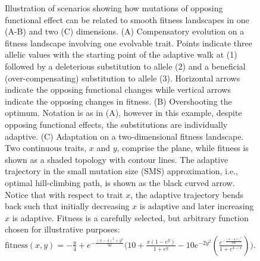 \documentclass[dvips,12pt,twoside,titlepage]{article}
\begin{document}
\begin{figure}[p]
\begin{center}
\caption{Illustration of scenarios showing how mutations of opposing functional effect can be related to smooth fitness landscapes in one (A-B) and two (C) dimensions. (A) Compensatory evolution on a fitness landscape involving one evolvable trait. Points indicate three allelic values with the starting point of the adaptive walk at {\scriptsize (1)} followed by a deleterious substitution to allele {\scriptsize (2)} and a beneficial (over-compensating) substitution to allele {\scriptsize (3)}. Horizontal arrows indicate the opposing functional changes while vertical arrows indicate the opposing changes in fitness. (B) Overshooting the optimum. Notation is as in (A), however in this example, despite opposing functional effects, the substitutions are individually adaptive. (C) Adaptation on a two-dimensional fitness landscape. Two continuous traits, $x$ and $y$, comprise the plane, while fitness is shown as a shaded topology with contour lines. The adaptive trajectory in the small mutation size (SMS) approximation, i.e., optimal hill-climbing path, is shown as the black curved arrow. Notice that with respect to trait $x$, the adaptive trajectory bends back such that initially decreasing $x$ is adaptive and later increasing $x$ is adaptive. Fitness is a carefully selected, but arbitrary function chosen for illustrative purposes: $\mathrm{fitness}(x,y) = -\frac{y}{4} + e^{-\frac{(x - 4)^2 + y^2}{50}} \Big(10 + \frac{x(1-e^y)}{1 + e^y} - 10 e^{-2y^2} (\frac{e^{-\frac{(x - 4.5)^2}{100}}}{1 + e^{4-x}})\Big)$.}
\label{Horseshoe}
\end{center}
\end{figure}
\clearpage
\end{document}
